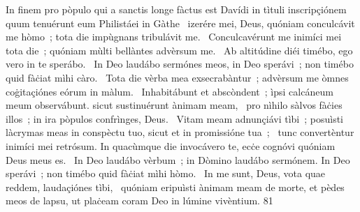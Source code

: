 { In finem pro pòpulo qui a sanctis longe fàctus est Davídi in tìtuli inscripçiónem quum tenuérunt eum Philistáei in Gàthe}
{%
~izerére mei, Deus, quóniam conculcávit me hòmo~; tota die impùgnans tribulávit me. 
~Conculcavérunt me inimíci mei tota die~; quóniam mùlti bellàntes advèrsum me. 
~Ab altitúdine diéi timébo, ego vero in te sperábo. 
~In Deo laudábo sermónes meos, in Deo sperávi~; non timébo quid fàċiat mìhi càro. 
~Tota die vèrba mea exsecrabàntur~; advèrsum me òmnes coġitaçiónes eórum in màlum. 
~Inhabitábunt et abscòndent~; ìpsi calcáneum meum observábunt. sicut sustinuérunt ànimam meam, 
~pro nìhilo sàlvos fàċies illos~; in ira pòpulos confrìnges, Deus. 
~Vitam meam adnunçiávi tìbi~; posuìsti làcrymas meas in conspèctu tuo, sicut et in promissióne tua~; 
~tunc convertèntur inimíci mei retrósum. In quacùmque die invocávero te, ecċe cognóvi quóniam Deus meus es. 
~In Deo laudábo vèrbum~; in Dòmino laudábo sermónem. In Deo sperávi~; non timébo quid fàċiat mìhi hòmo. 
~In me sunt, Deus, vota quae reddem, laudaçiónes tìbi, 
~quóniam eripuìsti ànimam meam de morte, et pèdes meos de lapsu, ut plaċeam coram Deo in lúmine vivèntium. 
}
{8}{1}
